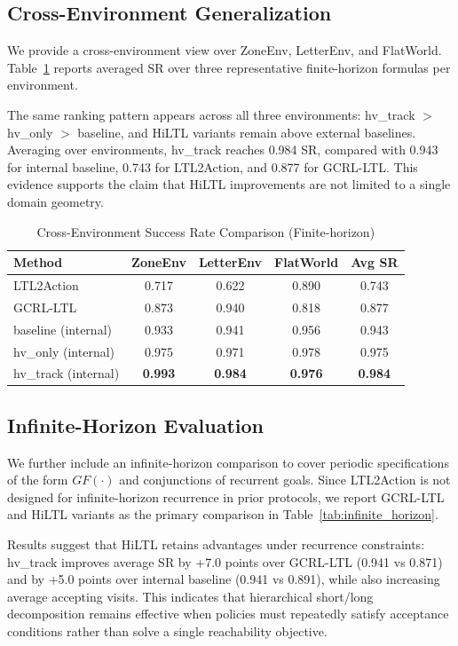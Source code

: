 \documentclass[journal]{IEEEtran}
\begin{document}
\subsection{Cross-Environment Generalization}

We provide a cross-environment view over ZoneEnv, LetterEnv, and FlatWorld. Table~\ref{tab:cross_env} reports averaged SR over three representative finite-horizon formulas per environment.

The same ranking pattern appears across all three environments: hv\_track $>$ hv\_only $>$ baseline, and HiLTL variants remain above external baselines. Averaging over environments, hv\_track reaches 0.984 SR, compared with 0.943 for internal baseline, 0.743 for LTL2Action, and 0.877 for GCRL-LTL. This evidence supports the claim that HiLTL improvements are not limited to a single domain geometry.

\begin{table}[t]
\centering
\caption{Cross-Environment Success Rate Comparison (Finite-horizon)}
\label{tab:cross_env}
\begin{tabular}{@{}lcccc@{}}
\toprule
\textbf{Method} & \textbf{ZoneEnv} & \textbf{LetterEnv} & \textbf{FlatWorld} & \textbf{Avg SR} \\ \midrule
LTL2Action & 0.717 & 0.622 & 0.890 & 0.743 \\
GCRL-LTL & 0.873 & 0.940 & 0.818 & 0.877 \\
baseline (internal) & 0.933 & 0.941 & 0.956 & 0.943 \\
hv\_only (internal) & 0.975 & 0.971 & 0.978 & 0.975 \\
hv\_track (internal) & \textbf{0.993} & \textbf{0.984} & \textbf{0.976} & \textbf{0.984} \\ \bottomrule
\end{tabular}
\end{table}

\subsection{Infinite-Horizon Evaluation}

We further include an infinite-horizon comparison to cover periodic specifications of the form $GF(\cdot)$ and conjunctions of recurrent goals. Since LTL2Action is not designed for infinite-horizon recurrence in prior protocols, we report GCRL-LTL and HiLTL variants as the primary comparison in Table~\ref{tab:infinite_horizon}.

Results suggest that HiLTL retains advantages under recurrence constraints: hv\_track improves average SR by +7.0 points over GCRL-LTL (0.941 vs 0.871) and by +5.0 points over internal baseline (0.941 vs 0.891), while also increasing average accepting visits. This indicates that hierarchical short/long decomposition remains effective when policies must repeatedly satisfy acceptance conditions rather than solve a single reachability objective.
\end{document}
